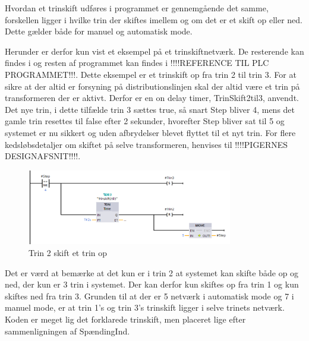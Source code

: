 Hvordan et trinskift udføres i programmet er gennemgående det samme, forskellen ligger i hvilke trin der skiftes imellem og om det er et skift op eller ned. Dette gælder både for manuel og automatisk mode.

Herunder er derfor kun vist et eksempel på et trinskiftnetværk. De resterende kan findes i og resten af programmet kan findes i !!!!REFERENCE TIL PLC PROGRAMMET!!!. Dette eksempel er et trinskift op fra trin 2 til trin 3. For at sikre at der altid er forsyning på distributionslinjen skal der altid være et trin på transformeren der er aktivt. Derfor er en on delay timer, TrinSkift2til3, anvendt. Det nye trin, i dette tilfælde trin 3 sættes true, så snart Step bliver 4, mens det gamle trin resettes til false efter 2 sekunder, hvorefter Step bliver sat til 5 og systemet er nu sikkert og uden afbrydelser blevet flyttet til et nyt trin. For flere kedsløbsdetaljer om skiftet på selve transformeren, henvises til !!!!PIGERNES DESIGNAFSNIT!!!!.

\begin{figure}[H] %
	\centering
	\includegraphics[width=0.8\textwidth]{Figure/Trin2SkiftOp}
	\caption{Trin 2 skift et trin op}
	\label{fig:Trin2SkiftOp}
\end{figure}

Det er værd at bemærke at det kun er i trin 2 at systemet kan skifte både op og ned, der kun er 3 trin i systemet. Der kan derfor kun skiftes op fra trin 1 og kun skiftes ned fra trin 3. Grunden til at der er 5 netværk i automatisk mode og 7 i manuel mode, er at trin 1's og trin 3's trinskift ligger i selve trinets netværk. Koden er meget lig det forklarede trinskift, men placeret lige efter sammenligningen af SpændingInd.